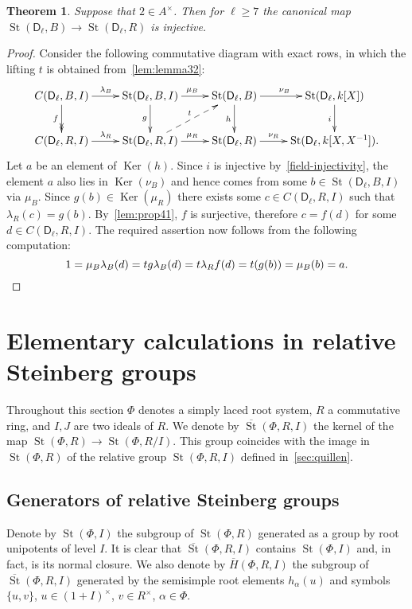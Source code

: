 \documentclass[oneside, 8pt]{amsart}
\newtheorem{externaltheorem}[lemma]{Theorem}
\theoremstyle{remark}
\theoremstyle{definition}
\numberwithin{lemma}{section}
\numberwithin{prop}{section}
\numberwithin{corollary}{section}
\numberwithin{externaltheorem}{section}
\DeclareMathOperator{\Ker}{Ker}
\DeclareMathOperator{\St}{St}
\newcommand{\rD}{\mathsf{D}}
\numberwithin{equation}{section}
\begin{document}
\begin{externaltheorem} \label{thm41} Suppose that $2 \in A^\times$. Then for $\ell \geq 7$ the canonical map $\St(\rD_\ell, B) \to \St(\rD_\ell, R)$ is injective. \end{externaltheorem}
\begin{proof}
 Consider the following commutative diagram with exact rows, in which the lifting $t$ is obtained from~\cref{lem:lemma32}:
\begin{equation*} \xymatrix{
 C(\rD_\ell, B, I) \ar[r]^{\lambda_B} \ar@{->>}[d]_{f} & \St(\rD_\ell, B, I) \ar[r]^{\mu_B} \ar[d]_{g} &
 \St(\rD_\ell, B) \ar[r]^{\nu_B} \ar[d]_{h} & \St(\rD_\ell, k[X]) \ar[d]_{i} \\
 C(\rD_\ell, R, I) \ar[r]^{\lambda_R}         & \St(\rD_\ell, R, I) \ar[r]^{\mu_R} \ar@{-->}[ur]^{t}&
 \St(\rD_\ell, R) \ar[r]^-{\nu_R}        & \St(\rD_\ell, k[X, X^{-1}]).
}\end{equation*}
Let $a$ be an element of $\Ker(h)$. Since $i$ is injective by~\cref{field-injectivity}, the element $a$
 also lies in $\Ker(\nu_B)$ and hence comes from some $b \in \St(\rD_\ell, B, I)$ via $\mu_B$.
Since $g(b) \in \Ker(\mu_R)$ there exists some $c \in C(\rD_\ell, R, I)$ such that $\lambda_R(c) = g(b)$. 
By~\cref{lem:prop41}, $f$ is surjective, therefore $c = f(d)$ for some $d \in C(\rD_\ell, R, I)$.
The required assertion now follows from the following computation:
 \[ 1 = \mu_B\lambda_B(d) = tg\lambda_B(d) = t\lambda_Rf(d) =t(g(b)) = \mu_B(b) = a. \qedhere \]
\end{proof}

\section{Elementary calculations in relative Steinberg groups}
Throughout this section $\Phi$ denotes a simply laced root system, $R$ a commutative ring, and $I, J$ are two ideals of $R$. 
We denote by $\overline{\St}(\Phi, R, I)$ the kernel of the map $\St(\Phi, R) \to \St(\Phi, R/I)$.
This group coincides with the image in $\St(\Phi, R)$ of the relative group $\St(\Phi, R, I)$ defined in~\cref{sec:quillen}.

\subsection{Generators of relative Steinberg groups}
Denote by $\St(\Phi, I)$ the subgroup of $\St(\Phi, R)$ generated as a group by root unipotents of level $I$.
It is clear that $\overline{\St}(\Phi, R, I)$ contains $\St(\Phi, I)$ and, in fact, is its normal closure.
We also denote by $\overline{H}(\Phi, R, I)$ the subgroup of $\overline{\St}(\Phi, R, I)$ generated by the semisimple root elements $h_\alpha(u)$ and symbols $\{u, v\}$, $u \in (1+I)^\times$, $v \in R^\times$, $\alpha\in \Phi$.
\end{document}
